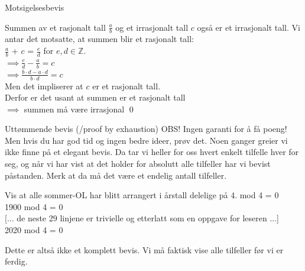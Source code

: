 \begin{frame}{Motsigelsesbevis}
    \begin{block}{Summen av et rasjonalt tall $\frac{a}{b}$ og et irrasjonalt tall $c$ også er et irrasjonalt tall.}
        Vi antar det motsatte, at summen blir et rasjonalt tall: \\
        \pause
        $\frac{a}{b}$ + $c$ = $\frac{e}{d}$ for $e, d \in \mathbb{Z}$.\\
        \pause
        $\implies \frac{e}{d} - \frac{a}{b} = c$\\
        \pause
        $\implies \frac{b\cdot d - a \cdot d}{b\cdot d} = c$\\
        \pause
        Men det impliserer at $c$ er et rasjonalt tall. \text{\Lightning}\\
        \pause
        Derfor er det usant at summen er et rasjonalt tall\\
        $\implies$ summen må være irrasjonal
        \qed
    \end{block}
\end{frame}

\begin{frame}{Uttømmende bevis (/proof by exhaustion)}
    OBS! Ingen garanti for å få poeng! Men hvis du har god tid og ingen bedre ideer, prøv det. Noen ganger greier vi ikke finne på et elegant bevis. Da tar vi heller for oss hvert enkelt tilfelle hver for seg, og når vi har vist at det holder for absolutt alle tilfeller har vi bevist påstanden. Merk at da må det være et endelig antall tilfeller.
    \pause
    \begin{block}{Vis at alle sommer-OL har blitt arrangert i årstall delelige på 4.}
         mod 4 = 0 \checkmark \\
        1900 mod 4 = 0 \checkmark \\
        {[... de neste 29 linjene er trivielle og etterlatt som en oppgave for leseren ...]}\\
        2020 mod 4 = 0 \checkmark
    \end{block}
    \pause
    Dette er altså ikke et komplett bevis. Vi må faktisk vise alle tilfeller før vi er ferdig.
\end{frame}
